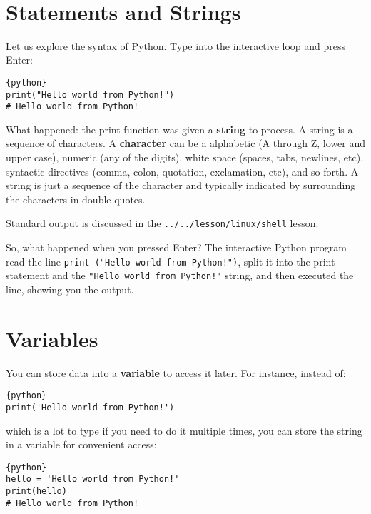 \FILENAME\



\section{Statements and Strings}\label{statements-and-strings}


Let us explore the syntax of Python. Type into the interactive loop and
press Enter:

\begin{lstlisting}{python}
print("Hello world from Python!")
# Hello world from Python! 
\end{lstlisting}

What happened: the print function was given a \textbf{string} to
process. A string is a sequence of characters. A \textbf{character} can
be a alphabetic (A through Z, lower and upper case), numeric (any of the
digits), white space (spaces, tabs, newlines, etc), syntactic directives
(comma, colon, quotation, exclamation, etc), and so forth. A string is
just a sequence of the character and typically indicated by surrounding
the characters in double quotes.

Standard output is discussed in the \verb|../../lesson/linux/shell| lesson.

So, what happened when you pressed Enter? The interactive Python program
read the line \verb|print ("Hello world from Python!")|, split it into the print
statement and the \verb|"Hello world from Python!"| string, and then executed
the line, showing you the output.

\section{Variables}\label{variables}

You can store data into a \textbf{variable} to access it later. For
instance, instead of:

\begin{lstlisting}{python}
print('Hello world from Python!')
\end{lstlisting}

which is a lot to type if you need to do it multiple times, you can
store the string in a variable for convenient access:

\begin{lstlisting}{python}
hello = 'Hello world from Python!'
print(hello)
# Hello world from Python!
\end{lstlisting}

